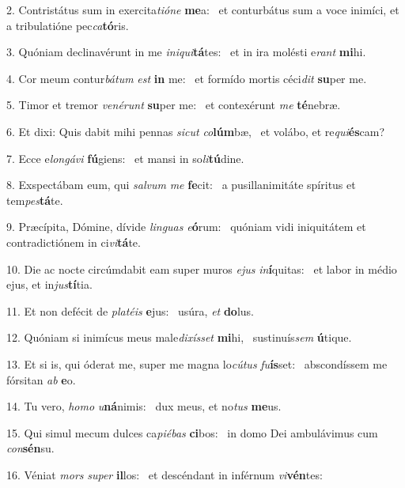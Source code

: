 2. Contristátus sum in exercita\textit{ti}\textit{ó}\textit{ne} \textbf{me}a: \ast\  et conturbátus sum a voce inimíci, et a tribulatióne pec\textit{ca}\textbf{tó}ris.\

3. Quóniam declinavérunt in me \textit{in}\textit{i}\textit{qui}\textbf{tá}tes: \ast\  et in ira molésti e\textit{rant} \textbf{mi}hi.\

4. Cor meum contur\textit{bá}\textit{tum} \textit{est} \textbf{in} me: \ast\  et formído mortis céci\textit{dit} \textbf{su}per me.\

5. Timor et tremor \textit{ve}\textit{né}\textit{runt} \textbf{su}per me: \ast\  et contexérunt \textit{me} \textbf{té}nebræ.\

6. Et dixi: Quis dabit mihi pennas \textit{sic}\textit{ut} \textit{co}\textbf{lúm}bæ, \ast\  et volábo, et re\textit{qui}\textbf{és}cam?\

7. Ecce e\textit{lon}\textit{gá}\textit{vi} \textbf{fú}giens: \ast\  et mansi in so\textit{li}\textbf{tú}dine.\

8. Exspectábam eum, qui \textit{sal}\textit{vum} \textit{me} \textbf{fe}cit: \ast\  a pusillanimitáte spíritus et tem\textit{pes}\textbf{tá}te.\

9. Præcípita, Dómine, dívide \textit{lin}\textit{guas} \textit{e}\textbf{ó}rum: \ast\  quóniam vidi iniquitátem et contradictiónem in ci\textit{vi}\textbf{tá}te.\

10. Die ac nocte circúmdabit eam super muros \textit{e}\textit{jus} \textit{in}\textbf{í}quitas: \ast\  et labor in médio ejus, et in\textit{jus}\textbf{tí}tia.\

11. Et non defécit de \textit{pla}\textit{té}\textit{is} \textbf{e}jus: \ast\  usúra, \textit{et} \textbf{do}lus.\

12. Quóniam si inimícus meus male\textit{di}\textit{xís}\textit{set} \textbf{mi}hi, \ast\  sustinuís\textit{sem} \textbf{ú}tique.\

13. Et si is, qui óderat me, super me magna lo\textit{cú}\textit{tus} \textit{fu}\textbf{ís}set: \ast\  abscondíssem me fórsitan \textit{ab} \textbf{e}o.\

14. Tu vero, \textit{ho}\textit{mo} \textit{u}\textbf{ná}nimis: \ast\  dux meus, et no\textit{tus} \textbf{me}us.\

15. Qui simul mecum dulces ca\textit{pi}\textit{é}\textit{bas} \textbf{ci}bos: \ast\  in domo Dei ambulávimus cum \textit{con}\textbf{sén}su.\

16. Véniat \textit{mors} \textit{su}\textit{per} \textbf{il}los: \ast\  et descéndant in inférnum \textit{vi}\textbf{vén}tes:\

